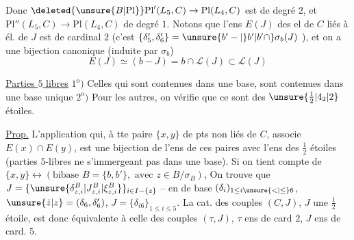 Donc $\deleted{\unsure{B|\mathrm{Pl}}}\mathrm{Pl}'(L_5,C)\to\mathrm{Pl}(L_4,C)$ est de degré $2$, et $\mathrm{Pl}''(L_5,C)\to\mathrm{Pl}(L_4,C)$ de degré $1$. Notons que l'ens $E(J)$ des el de $C$ liés à  él. de $J$ est de cardinal $2$ (c'est $\{\delta'_5,\delta'_6\}=\unsure{b'-|\}b'|b'\cap}\sigma_b(J)$ ), et on a une bijection canonique (induite par $\sigma_b$)
\[
E(J)\simeq (b-\!J)=b\cap \mathscr L(J)\subset \mathscr L(J)
\]

\uline{Parties $5$ libres} $1^{\mathrm o})$ Celles qui sont contenues dans une base, sont contenues dans une base unique
$2^{\mathrm o})$ Pour les autres, on vérifie que ce sont des $\unsure{\frac12|4_2|2}$ étoiles.

\uline{Prop.} L'application qui, à tte paire $\{x,y\}$ de pts non liés de $C$, associe $E(x)\cap E(y)$, est une bijection de l'ens de ces paires avec l'ens des $\frac12$ étoiles (parties $5$-libres ne s'immergeant pas dans une base).  Si on tient compte de $\{x,y\}\longleftrightarrow(\text{bibase }B=\{b,b'\},\text{ avec }z\in B/\sigma_B)$,
On trouve que $J=\{\unsure{\delta^B_{z,i}|J^B_{z,i}|\xi^B_{z,i}}\}_{i\in I-\{z\}}$ -- en  de base $(\delta_i)_{1\leq i\unsure{<|\leq}6}$, $\unsure{\dot z|z}=(\delta_6,\delta'_6)$, $J=\{\delta_{i6}\}_{1\leq i\leq5}$. La cat. des  couples $(C,J)$, $J$ une $\frac12$ étoile, est donc équivalente à celle des couples $(\tau,J)$, $\tau$ ens de card $2$, $J$ ens de card. $5$.

